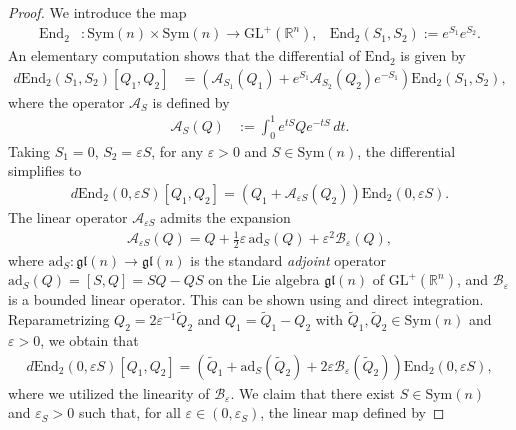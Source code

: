 \documentclass{article}
\theoremstyle{remark}
\newcommand{\GL}{\mathrm{GL}^+(\mathbb{R}^n)}
\newcommand{\Sym}{\mathrm{Sym}(n)}
\begin{document}
\begin{proof}
    We introduce the map
    \begin{align*}
        \mathrm{End}_2&:\Sym\times\Sym\rightarrow \GL, & \mathrm{End}_2(S_1,S_2):= e^{S_1}e^{S_2}.
    \end{align*}
    An elementary computation shows that the differential of $\mathrm{End}_2$ is given by
    \begin{align*}
        d\mathrm{End}_2(S_1,S_2)[Q_1,Q_2] &= \left(\mathcal{A}_{S_1}(Q_1) + e^{S_1}\mathcal{A}_{S_2}(Q_2)e^{-S_1}\right)\mathrm{End}_2(S_1,S_2),
    \end{align*}
    where the operator $\mathcal{A}_S$ is defined by
    \begin{align*}
        \mathcal{A}_S(Q)&:=\int_0^1 e^{t S} Q e^{-t S}\,dt.
    \end{align*}
    Taking $S_1 = 0$, $S_2=\varepsilon S$, for any $\varepsilon>0$ and $S\in\Sym$, the differential simplifies to
    \begin{align*}
        d\mathrm{End}_2(0,\varepsilon S)[Q_1,Q_2] = \left(Q_1+\mathcal{A}_{\varepsilon S}(Q_2)\right)\mathrm{End}_2(0,\varepsilon S).
    \end{align*}
    The linear operator $\mathcal{A}_{\varepsilon S}$ admits the expansion
    \begin{align*}
        \mathcal{A}_{\varepsilon S}(Q) = Q + \frac{1}{2}\varepsilon\,\mathrm{ad}_S(Q) + \varepsilon^2\mathcal{B}_{\varepsilon}(Q),
    \end{align*}
    where $\mathrm{ad}_S:\mathfrak{gl}(n)\rightarrow\mathfrak{gl}(n)$ is the standard \emph{adjoint} operator $\mathrm{ad}_S(Q)=[S,Q]=SQ-QS$ on the Lie algebra $\mathfrak{gl}(n)$ of $\GL$, and $\mathcal{B}_{\varepsilon}$ is a bounded linear operator. This can be shown using \cite[Proposition 3.35]{hall2003lie} and direct integration. Reparametrizing  $Q_2=2\varepsilon^{-1}\tilde{Q}_2$ and $Q_1=\tilde{Q}_1-Q_2$ with $\tilde{Q}_1,\tilde{Q}_2\in\Sym$ and $\varepsilon>0$, we obtain that
    \begin{align*}
        d\mathrm{End}_2(0,\varepsilon S)[Q_1,Q_2] = (\tilde{Q}_1 + \mathrm{ad}_S(\tilde{Q}_2) + 2\varepsilon\mathcal{B}_{\varepsilon}(\tilde{Q}_2))\mathrm{End}_2(0,\varepsilon S),
    \end{align*}
    where we utilized the linearity of $\mathcal{B}_{\varepsilon}$. We claim that there exist $S\in\Sym$ and $\varepsilon_S>0$ such that, for all $\varepsilon\in (0,\varepsilon_S)$, the linear map defined by

\end{proof}
\end{document}
